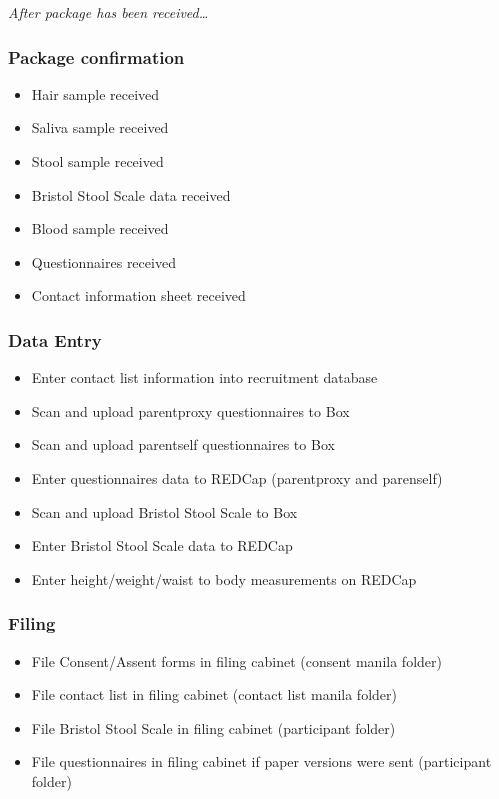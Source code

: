 \documentclass[]{book}
\providecommand{\tightlist}{%
  \setlength{\itemsep}{0pt}\setlength{\parskip}{0pt}}
\begin{document}
\emph{After package has been received\ldots{}}

\hypertarget{package-confirmation-1}{%
\subsubsection{Package confirmation}\label{package-confirmation-1}}

\begin{itemize}
\tightlist
\item
  Hair sample received
\item
  Saliva sample received
\item
  Stool sample received
\item
  Bristol Stool Scale data received
\item
  Blood sample received
\item
  Questionnaires received
\item
  Contact information sheet received
\end{itemize}

\hypertarget{data-entry-5}{%
\subsubsection{Data Entry}\label{data-entry-5}}

\begin{itemize}
\tightlist
\item
  Enter contact list information into recruitment database
\item
  Scan and upload parentproxy questionnaires to Box
\item
  Scan and upload parentself questionnaires to Box
\item
  Enter questionnaires data to REDCap (parentproxy and parenself)
\item
  Scan and upload Bristol Stool Scale to Box
\item
  Enter Bristol Stool Scale data to REDCap
\item
  Enter height/weight/waist to body measurements on REDCap
\end{itemize}

\hypertarget{filing-7}{%
\subsubsection{Filing}\label{filing-7}}

\begin{itemize}
\tightlist
\item
  File Consent/Assent forms in filing cabinet (consent manila folder)
\item
  File contact list in filing cabinet (contact list manila folder)
\item
  File Bristol Stool Scale in filing cabinet (participant folder)
\item
  File questionnaires in filing cabinet if paper versions were sent (participant folder)
\end{itemize}
\end{document}
